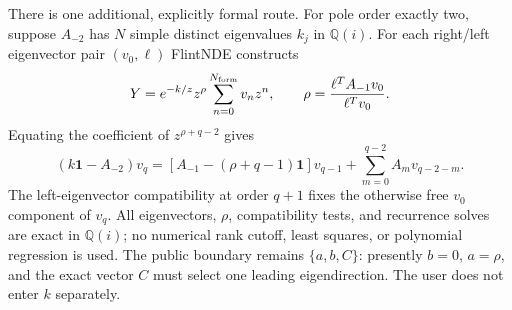 \documentclass[11pt]{article}
\newcommand{\Id}{\mathbf 1}
\begin{document}
There is one additional, explicitly formal route.  For pole order exactly two, suppose
$A_{-2}$ has $N$ simple distinct eigenvalues $k_j$ in $\mathbb Q(i)$.  For each right/left
eigenvector pair $(v_0,\ell)$ FlintNDE constructs
\begin{equation}
 Y=e^{-k/z}z^\rho\sum_{n=0}^{N_{\rm form}}v_nz^n,
 \qquad
 \rho=\frac{\ell^T A_{-1}v_0}{\ell^Tv_0}.
 \label{eq:formal-rank-one-ansatz}
\end{equation}
Equating the coefficient of $z^{\rho+q-2}$ gives
\begin{equation}
 (k\Id-A_{-2})v_q=
 \left[A_{-1}-(\rho+q-1)\Id\right]v_{q-1}
 +\sum_{m=0}^{q-2}A_m v_{q-2-m}.
 \label{eq:formal-rank-one-recurrence}
\end{equation}
The left-eigenvector compatibility at order $q+1$ fixes the otherwise free $v_0$ component
of $v_q$.  All eigenvectors, $\rho$, compatibility tests, and recurrence solves are exact in
$\mathbb Q(i)$; no numerical rank cutoff, least squares, or polynomial regression is used.
The public boundary remains $\{a,b,C\}$: presently $b=0$, $a=\rho$, and the exact vector $C$
must select one leading eigendirection.  The user does not enter $k$ separately.
\end{document}
